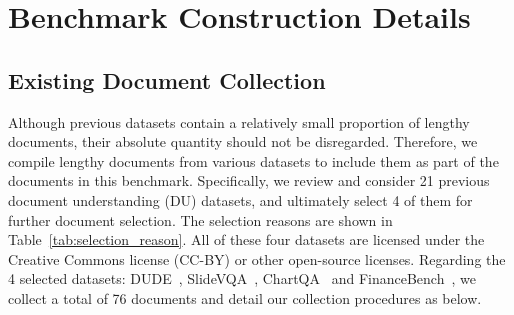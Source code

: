 \section{Benchmark Construction Details}

\subsection{Existing Document Collection}
\label{appendix: Existing Document Collection}
Although previous datasets contain a relatively small proportion of lengthy documents, their absolute quantity should not be disregarded. Therefore, we compile lengthy documents from various datasets to include them as part of the documents in this benchmark. Specifically, we review and consider 21 previous document understanding (DU) datasets, and ultimately select 4 of them for further document selection. The selection reasons are shown in Table~\ref{tab:selection_reason}. All of these four datasets are licensed under the Creative Commons license (CC-BY) or other open-source licenses. Regarding the 4 selected datasets: DUDE~\cite{VanLandeghem2023DocumentUD}, SlideVQA~\cite{SlideVQA2023}, ChartQA~\cite{masry-etal-2022-chartqa} and FinanceBench~\cite{islam2023financebench}, we collect a total of 76 documents and detail our collection procedures as below.

